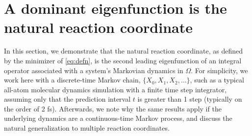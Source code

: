 \documentclass[aip, jcp, reprint, nolinenumbers, twocolumn, nobalancelastpage]{revtex4-1}
\begin{document}


\section{A dominant eigenfunction is the natural reaction coordinate}
\label{sect:natureal_reaction}
In this section, we demonstrate that the natural reaction coordinate, as defined by the minimizer of \cref{eq:defn}, is the second leading eigenfunction of an integral operator associated with a system's Markovian dynamics in $\Omega$. For simplicity, we work here with a discrete-time Markov chain, $\{X_0, X_1, X_2, \ldots \}$, such as a typical all-atom molecular dynamics simulation with a finite time step integrator, assuming only that the prediction interval $t$ is greater than 1 step (typically on the order of 2 fs). Afterwards, we note why the same results apply if the underlying dynamics are a continuous-time Markov process, and discuss the natural generalization to multiple reaction coordinates.
\end{document}

